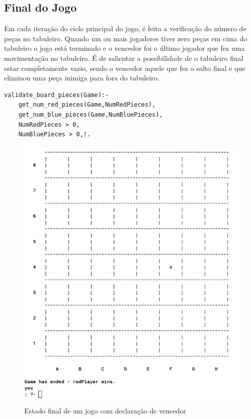 \documentclass[a4paper]{article}
\begin{document}
\subsection{Final do Jogo}
Em cada iteração do ciclo principal do jogo, é feita a verificação do número de peças no tabuleiro. Quando um ou mais jogadores tiver zero peças em cima do tabuleiro o jogo está terminado e o vencedor foi o último jogador que fez uma movimentação no tabuleiro. É de salientar a possibilidade de o tabuleiro final estar completamente vazio, sendo o vencedor aquele que fez o salto final e que eliminou uma peça inimiga para fora do tabuleiro.

\begin{lstlisting}[style=customprolog]
validate_board_pieces(Game):-
    get_num_red_pieces(Game,NumRedPieces),
    get_num_blue_pieces(Game,NumBluePieces),
    NumRedPieces > 0,
    NumBluePieces > 0,!.
\end{lstlisting}

\begin{figure}[H]
    \center
    \includegraphics[scale=0.5]{resources/game-ending.png}
    \caption{Estado final de um jogo com declaração de vencedor}
    \label{fig:game-ending.png}
\end{figure}
\end{document}
